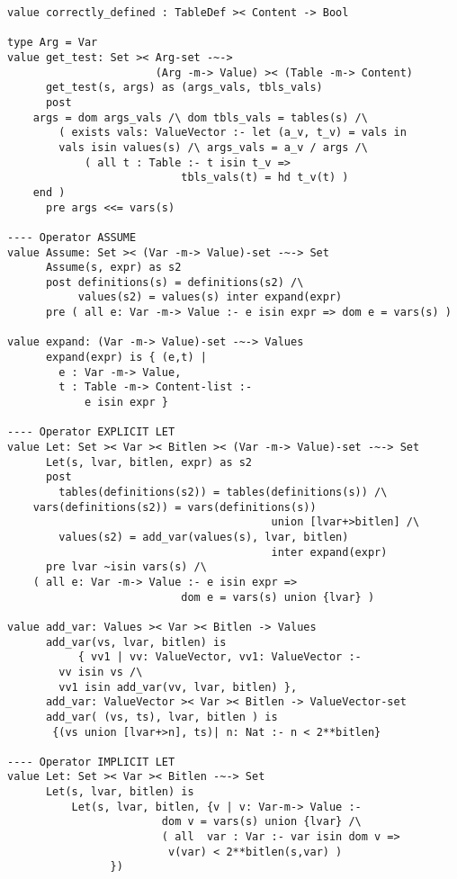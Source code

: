 \begin{lstlisting}
value correctly_defined : TableDef >< Content -> Bool

type Arg = Var
value get_test: Set >< Arg-set -~->
                       (Arg -m-> Value) >< (Table -m-> Content)
      get_test(s, args) as (args_vals, tbls_vals)
      post
	args = dom args_vals /\ dom tbls_vals = tables(s) /\
        ( exists vals: ValueVector :- let (a_v, t_v) = vals in
	    vals isin values(s) /\ args_vals = a_v / args /\
            ( all t : Table :- t isin t_v =>
                           tbls_vals(t) = hd t_v(t) )
	end )
      pre args <<= vars(s)

---- Operator ASSUME
value Assume: Set >< (Var -m-> Value)-set -~-> Set
      Assume(s, expr) as s2
      post definitions(s) = definitions(s2) /\
           values(s2) = values(s) inter expand(expr)
      pre ( all e: Var -m-> Value :- e isin expr => dom e = vars(s) )

value expand: (Var -m-> Value)-set -~-> Values
      expand(expr) is { (e,t) |
		e : Var -m-> Value,
		t : Table -m-> Content-list :-
			e isin expr }

---- Operator EXPLICIT LET
value Let: Set >< Var >< Bitlen >< (Var -m-> Value)-set -~-> Set
      Let(s, lvar, bitlen, expr) as s2
      post
        tables(definitions(s2)) = tables(definitions(s)) /\
	vars(definitions(s2)) = vars(definitions(s))
                                         union [lvar+>bitlen] /\
        values(s2) = add_var(values(s), lvar, bitlen)
                                         inter expand(expr)
      pre lvar ~isin vars(s) /\
	( all e: Var -m-> Value :- e isin expr =>
                           dom e = vars(s) union {lvar} )

value add_var: Values >< Var >< Bitlen -> Values
      add_var(vs, lvar, bitlen) is
           { vv1 | vv: ValueVector, vv1: ValueVector :-
		vv isin vs /\
		vv1 isin add_var(vv, lvar, bitlen) },
      add_var: ValueVector >< Var >< Bitlen -> ValueVector-set
      add_var( (vs, ts), lvar, bitlen ) is
	   {(vs union [lvar+>n], ts)| n: Nat :- n < 2**bitlen}

---- Operator IMPLICIT LET
value Let: Set >< Var >< Bitlen -~-> Set
      Let(s, lvar, bitlen) is
          Let(s, lvar, bitlen, {v | v: Var-m-> Value :-
                        dom v = vars(s) union {lvar} /\
                        ( all  var : Var :- var isin dom v =>
                         v(var) < 2**bitlen(s,var) )
				})



\end{lstlisting}
